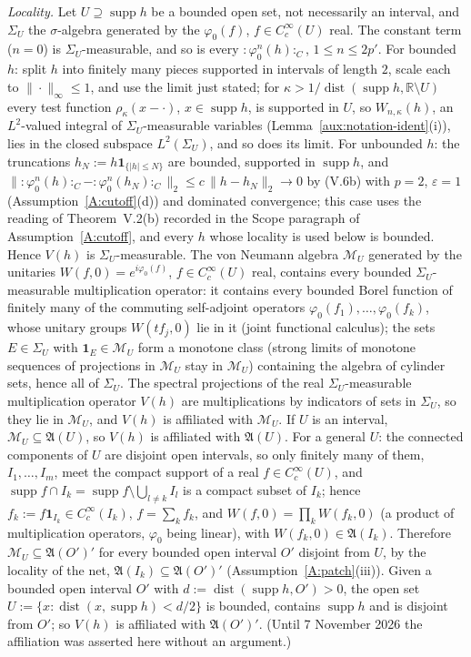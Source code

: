 \documentclass[11pt,a4paper]{article}
\theoremstyle{plain}
\theoremstyle{definition}
\theoremstyle{plain}
\theoremstyle{definition}
\newcommand{\R}{\mathbb{R}}
\newcommand{\A}{\mathfrak{A}}
\DeclareMathOperator{\supp}{supp}
\DeclareMathOperator{\dist}{dist}
\begin{document}
\emph{Locality.}  Let $U\supseteq\supp h$ be a bounded open set, not necessarily an interval,
and $\Sigma_U$ the $\sigma$-algebra generated by the $\varphi_0(f)$, $f\in C_c^\infty(U)$ real.
The constant term ($n=0$) is $\Sigma_U$-measurable, and so is every
${:}\varphi_0^n(h){:}_C$, $1\le n\le2p'$.  For bounded $h$: split $h$
into finitely many pieces supported in intervals of length $2$, scale each to
$\|\cdot\|_\infty\le1$, and use the limit just stated; for $\kappa>1/\dist(\supp h,\R\setminus
U)$ every test function $\rho_\kappa(x-\cdot)$, $x\in\supp h$, is supported in $U$, so
$W_{n,\kappa}(h)$, an $L^2$-valued integral of $\Sigma_U$-measurable variables
(Lemma~\ref{aux:notation-ident}(i)), lies in the closed subspace $L^2(\Sigma_U)$, and so does
its limit.  For unbounded $h$: the truncations $h_N:=h\mathbf 1_{\{|h|\le N\}}$ are bounded,
supported in $\supp h$, and $\|{:}\varphi_0^n(h){:}_C-{:}\varphi_0^n(h_N){:}_C\|_2\le
c\,\|h-h_N\|_2\to0$ by (V.6b) with $p=2$, $\varepsilon=1$ (Assumption~\ref{A:cutoff}(d)) and
dominated convergence; this case uses the reading of Theorem~V.2(b) recorded in the Scope
paragraph of Assumption~\ref{A:cutoff}, and every $h$ whose locality is used below is
bounded.  Hence $V(h)$ is
$\Sigma_U$-measurable.  The von Neumann algebra $\mathcal M_U$ generated by the unitaries
$W(f,0)=e^{i\varphi_0(f)}$, $f\in C_c^\infty(U)$ real, contains every
bounded $\Sigma_U$-measurable multiplication operator: it contains every bounded Borel function
of finitely many of the commuting self-adjoint operators $\varphi_0(f_1),\dots,\varphi_0(f_k)$,
whose unitary groups $W(tf_j,0)$ lie in it (joint functional calculus); the sets $E\in\Sigma_U$
with $\mathbf 1_E\in\mathcal M_U$ form a monotone class (strong limits of monotone sequences of
projections in $\mathcal M_U$ stay in $\mathcal M_U$) containing the algebra of cylinder sets,
hence all of $\Sigma_U$.  The spectral projections of the real $\Sigma_U$-measurable
multiplication operator $V(h)$ are multiplications by indicators of sets in $\Sigma_U$, so they
lie in $\mathcal M_U$, and $V(h)$ is affiliated with $\mathcal M_U$.  If $U$ is an interval,
$\mathcal M_U\subseteq\A(U)$, so $V(h)$ is affiliated with $\A(U)$.  For a general $U$: the
connected components of $U$ are disjoint open intervals, so only finitely many of them,
$I_1,\dots,I_m$, meet the compact support of a real $f\in C_c^\infty(U)$, and
$\supp f\cap I_k=\supp f\setminus\bigcup_{l\ne k}I_l$ is a compact subset of $I_k$; hence
$f_k:=f\mathbf 1_{I_k}\in C_c^\infty(I_k)$, $f=\sum_kf_k$, and $W(f,0)=\prod_kW(f_k,0)$ (a
product of multiplication operators, $\varphi_0$ being linear), with $W(f_k,0)\in\A(I_k)$.
Therefore $\mathcal M_U\subseteq\A(O')'$ for every bounded open interval $O'$ disjoint from $U$,
by the locality of the net, $\A(I_k)\subseteq\A(O')'$ (Assumption~\ref{A:patch}(iii)).  Given a
bounded open interval $O'$ with $d:=\dist(\supp h,O')>0$, the open set
$U:=\{x:\dist(x,\supp h)<d/2\}$ is bounded, contains $\supp h$ and is disjoint from $O'$; so
$V(h)$ is affiliated with $\A(O')'$.  (Until 7 November 2026 the affiliation was asserted here
without an argument.)
\end{document}
